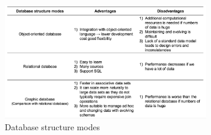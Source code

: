 \begin{figure}
	\begin{center}
		\includegraphics[width=0.8\textwidth]{WolverineChart2}
	\end{center}
	\caption{Database structure modes}
\end{figure}
\clearpage
